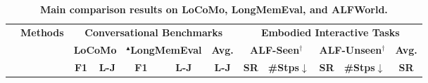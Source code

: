 \begin{table}[t]
    \centering
    \caption{\textbf{Main comparison results on LoCoMo, LongMemEval, and ALFWorld.}}
    \label{tab:exp_main}

    \begin{tabular}{>{\centering\arraybackslash}m{0.9cm} l cc cc c | cc cc c}
        \toprule
        \multirow{3}{*}{\textbf{Model}} &
        \multirow{3}{*}{\textbf{Methods}} &
        \multicolumn{5}{c}{\textbf{Conversational Benchmarks}} &
        \multicolumn{5}{c}{\textbf{Embodied Interactive Tasks}} \\
        \cmidrule(lr){3-7} \cmidrule(lr){8-12}
        & &
        \multicolumn{2}{c}{\textbf{LoCoMo}} &
        \multicolumn{2}{c}{\textbf{$^\blacktriangle$LongMemEval}} &
        \multicolumn{1}{c}{\textbf{Avg.}} &
        \multicolumn{2}{c}{\textbf{ALF-Seen$^\dagger$}} &
        \multicolumn{2}{c}{\textbf{ALF-Unseen$^\dagger$}} &
        \multicolumn{1}{c}{\textbf{Avg.}} \\
        \cmidrule(lr){3-4} \cmidrule(lr){5-6} \cmidrule(lr){7-7}
        \cmidrule(lr){8-9} \cmidrule(lr){10-11} \cmidrule(lr){12-12}
        & &
        \textbf{F1} & \textbf{L-J} &
        \textbf{F1} & \textbf{L-J} &
        \textbf{L-J} &
        \textbf{SR} & \textbf{\#Stps$\downarrow$} &
        \textbf{SR} & \textbf{\#Stps$\downarrow$} &
        \textbf{SR} \\
        \midrule




\end{tabular}
\end{table}
